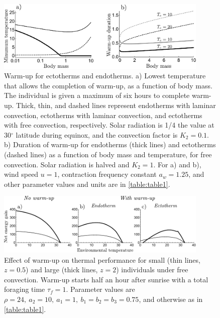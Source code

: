 \begin{figure}
\centering \includegraphics[width=0.9\textwidth]{fig3}
\caption{
    \setstretch{\stretchby}
	Warm-up for ectotherms and endotherms.
	a) Lowest temperature that allows the completion of warm-up, as a function of body mass.
	The individual is given a maximum of six hours to complete warm-up.
    Thick, thin, and dashed lines represent endotherms with laminar convection, ectotherms with laminar convection, and ectotherms with free convection, respectively.
    Solar radiation is 1/4 the value at 30$^\circ$ latitude during equinox, and the convection factor is $K_2 = 0.1$.
    b) Duration of warm-up for endotherms (thick lines) and ectotherms (dashed lines) as a function of body mass and temperature, for free convection.  %
    Solar radiation is halved and $K_2 = 1$.
    For a) and b), wind speed $u = 1$, contraction frequency constant $a_w = 1.25$, and other parameter values and units are in \cref{table:table1}.
}
\label{fig3}
\end{figure}
%
\begin{figure}
\centering \includegraphics[width=0.9\textwidth]{fig4}
\caption{
    \setstretch{\stretchby}
    Effect of warm-up on thermal performance for small (thin lines, $z = 0.5$) and large (thick lines, $z = 2$) individuals under free convection.
    Warm-up starts half an hour after sunrise with a total foraging time $\tau_f = 1$.
    Parameter values are $\rho = 24,\ a_2 = 10,\ a_1 = 1, \ b_1 = b_2 = b_3 = 0.75$, and otherwise as in \cref{table:table1}. %
}
\label{fig4}
\end{figure}

